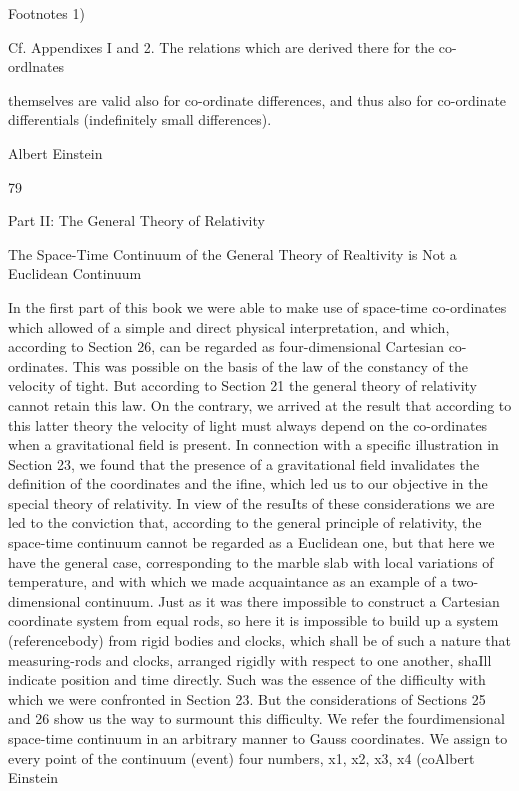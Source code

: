 \documentclass{article}
\begin{document}
Footnotes
1)

Cf. Appendixes I and 2. The relations which are derived there for the co-ordlnates

themselves are valid also for co-ordinate differences, and thus also for co-ordinate
differentials (indefinitely small differences).

Albert Einstein

79

Part II: The General Theory of Relativity

The Space-Time Continuum of the
General Theory of Realtivity is
Not a Euclidean Continuum

In the first part of this book we were able to make use of space-time co-ordinates which
allowed of a simple and direct physical interpretation, and which, according to Section 26,
can be regarded as four-dimensional Cartesian co-ordinates. This was possible on the basis
of the law of the constancy of the velocity of tight. But according to Section 21 the general
theory of relativity cannot retain this law. On the contrary, we arrived at the result that
according to this latter theory the velocity of light must always depend on the co-ordinates
when a gravitational field is present. In connection with a specific illustration in Section 23,
we found that the presence of a gravitational field invalidates the definition of the
coordinates and the ifine, which led us to our objective in the special theory of relativity.
In view of the resuIts of these considerations we are led to the conviction that, according
to the general principle of relativity, the space-time continuum cannot be regarded as a
Euclidean one, but that here we have the general case, corresponding to the marble slab
with local variations of temperature, and with which we made acquaintance as an example
of a two-dimensional continuum. Just as it was there impossible to construct a Cartesian coordinate system from equal rods, so here it is impossible to build up a system (referencebody) from rigid bodies and clocks, which shall be of such a nature that measuring-rods and
clocks, arranged rigidly with respect to one another, shaIll indicate position and time
directly. Such was the essence of the difficulty with which we were confronted in Section
23.
But the considerations of Sections 25 and 26 show us the way to surmount this difficulty.
We refer the fourdimensional space-time continuum in an arbitrary manner to Gauss coordinates. We assign to every point of the continuum (event) four numbers, x1, x2, x3, x4 (coAlbert Einstein
\end{document}
